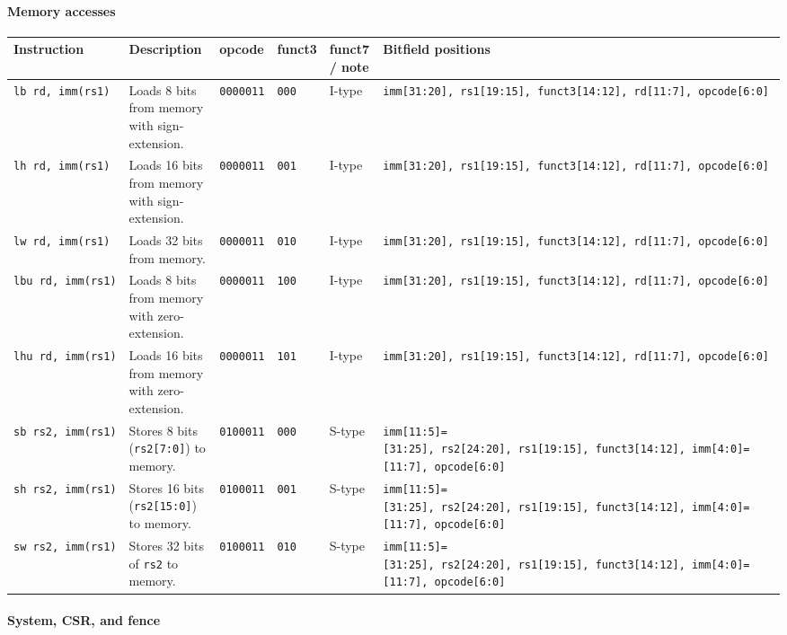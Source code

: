 \documentclass[]{article}
\let\oldparagraph\paragraph
\renewcommand{\paragraph}[1]{\oldparagraph{#1}\mbox{}}
\begin{document}
\hypertarget{memory-accesses}{%
\paragraph{Memory accesses}\label{memory-accesses}}

\begin{longtable}[]{@{}llllll@{}}
\toprule
Instruction & Description & opcode & funct3 & funct7 / note & Bitfield
positions\tabularnewline
\midrule
\endhead
\texttt{lb\ rd,\ imm(rs1)} & Loads 8 bits from memory with
sign-extension. & \texttt{0000011} & \texttt{000} & I-type &
\texttt{imm{[}31:20{]},\ rs1{[}19:15{]},\ funct3{[}14:12{]},\ rd{[}11:7{]},\ opcode{[}6:0{]}}\tabularnewline
\texttt{lh\ rd,\ imm(rs1)} & Loads 16 bits from memory with
sign-extension. & \texttt{0000011} & \texttt{001} & I-type &
\texttt{imm{[}31:20{]},\ rs1{[}19:15{]},\ funct3{[}14:12{]},\ rd{[}11:7{]},\ opcode{[}6:0{]}}\tabularnewline
\texttt{lw\ rd,\ imm(rs1)} & Loads 32 bits from memory. &
\texttt{0000011} & \texttt{010} & I-type &
\texttt{imm{[}31:20{]},\ rs1{[}19:15{]},\ funct3{[}14:12{]},\ rd{[}11:7{]},\ opcode{[}6:0{]}}\tabularnewline
\texttt{lbu\ rd,\ imm(rs1)} & Loads 8 bits from memory with
zero-extension. & \texttt{0000011} & \texttt{100} & I-type &
\texttt{imm{[}31:20{]},\ rs1{[}19:15{]},\ funct3{[}14:12{]},\ rd{[}11:7{]},\ opcode{[}6:0{]}}\tabularnewline
\texttt{lhu\ rd,\ imm(rs1)} & Loads 16 bits from memory with
zero-extension. & \texttt{0000011} & \texttt{101} & I-type &
\texttt{imm{[}31:20{]},\ rs1{[}19:15{]},\ funct3{[}14:12{]},\ rd{[}11:7{]},\ opcode{[}6:0{]}}\tabularnewline
\texttt{sb\ rs2,\ imm(rs1)} & Stores 8 bits (\texttt{rs2{[}7:0{]}}) to
memory. & \texttt{0100011} & \texttt{000} & S-type &
\texttt{imm{[}11:5{]}={[}31:25{]},\ rs2{[}24:20{]},\ rs1{[}19:15{]},\ funct3{[}14:12{]},\ imm{[}4:0{]}={[}11:7{]},\ opcode{[}6:0{]}}\tabularnewline
\texttt{sh\ rs2,\ imm(rs1)} & Stores 16 bits (\texttt{rs2{[}15:0{]}}) to
memory. & \texttt{0100011} & \texttt{001} & S-type &
\texttt{imm{[}11:5{]}={[}31:25{]},\ rs2{[}24:20{]},\ rs1{[}19:15{]},\ funct3{[}14:12{]},\ imm{[}4:0{]}={[}11:7{]},\ opcode{[}6:0{]}}\tabularnewline
\texttt{sw\ rs2,\ imm(rs1)} & Stores 32 bits of \texttt{rs2} to memory.
& \texttt{0100011} & \texttt{010} & S-type &
\texttt{imm{[}11:5{]}={[}31:25{]},\ rs2{[}24:20{]},\ rs1{[}19:15{]},\ funct3{[}14:12{]},\ imm{[}4:0{]}={[}11:7{]},\ opcode{[}6:0{]}}\tabularnewline
\bottomrule
\end{longtable}

\hypertarget{system-csr-and-fence}{%
\paragraph{System, CSR, and fence}\label{system-csr-and-fence}}
\end{document}
